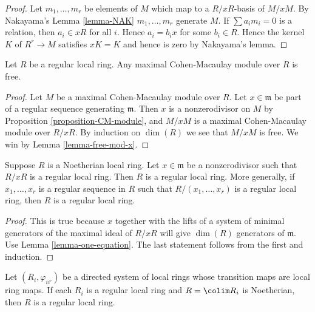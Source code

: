 \begin{proof}
Let $m_1, \ldots, m_r$ be elements of $M$ which map to
a $R/xR$-basis of $M/xM$. By Nakayama's Lemma \ref{lemma-NAK}
$m_1, \ldots, m_r$ generate $M$. If $\sum a_i m_i = 0$
is a relation, then $a_i \in xR$ for all $i$. Hence
$a_i = b_i x$ for some $b_i \in R$. Hence
the kernel $K$ of $R^r \to M$ satisfies $xK = K$
and hence is zero by Nakayama's lemma.
\end{proof}

\begin{lemma}
\label{lemma-regular-mcm-free}
Let $R$ be a regular local ring.
Any maximal Cohen-Macaulay module over $R$ is free.
\end{lemma}

\begin{proof}
Let $M$ be a maximal Cohen-Macaulay module over $R$.
Let $x \in \mathfrak m$ be part of a regular sequence
generating $\mathfrak m$. Then $x$ is a nonzerodivisor
on $M$ by Proposition \ref{proposition-CM-module}, and
$M/xM$ is a maximal Cohen-Macaulay module over $R/xR$.
By induction on $\dim(R)$ we see that $M/xM$ is free.
We win by Lemma \ref{lemma-free-mod-x}.
\end{proof}

\begin{lemma}
\label{lemma-regular-mod-x}
Suppose $R$ is a Noetherian local ring.
Let $x \in \mathfrak m$ be a nonzerodivisor
such that $R/xR$ is a regular local ring. Then $R$ is a regular local ring.
More generally, if $x_1, \ldots, x_r$ is a regular sequence in $R$
such that $R/(x_1, \ldots, x_r)$ is a regular local ring, then
$R$ is a regular local ring.
\end{lemma}

\begin{proof}
This is true because $x$ together with the lifts of a system
of minimal generators of the maximal ideal of $R/xR$ will give
$\dim(R)$ generators of $\mathfrak m$.
Use Lemma \ref{lemma-one-equation}.
The last statement follows from the first and induction.
\end{proof}

\begin{lemma}
\label{lemma-colimit-regular}
Let $(R_i, \varphi_{ii'})$ be a directed system of local rings whose
transition maps are local ring maps. If each $R_i$ is a regular local ring and
$R = \colim R_i$ is Noetherian, then $R$ is a regular local ring.
\end{lemma}

